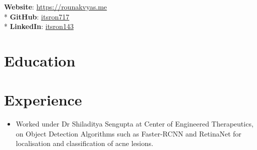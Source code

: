 \documentclass[11pt,a4paper,sans]{moderncv} %
\begin{document}
\makecvtitle %


\textbf{Website}: \href{https://rounakvyas.me}{https://rounakvyas.me} \\*
\textbf{GitHub}: \href{https://github.com/itsron717}{itsron717} \\*
\textbf{LinkedIn}: \href{https://www.linkedin.com/in/itsron143/}{itsron143} 


\section{Education}




\section{Experience}
{
\begin{itemize}
    \item Worked under Dr Shiladitya Sengupta at Center of Engineered Therapeutics, on Object Detection Algorithms such as Faster-RCNN and RetinaNet for localisation and classification of acne lesions. 
\end{itemize}
}
\end{document}
